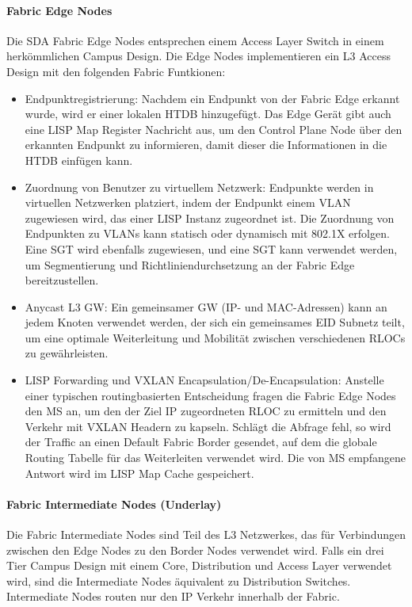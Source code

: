 \paragraph{Fabric Edge Nodes}
Die SDA Fabric Edge Nodes entsprechen einem Access Layer Switch in einem herkömmlichen Campus Design. Die Edge Nodes implementieren ein L3 Access Design mit den folgenden Fabric Funtkionen: \cite{sda-designguide}
\begin{itemize}	
	\item Endpunktregistrierung: Nachdem ein Endpunkt von der Fabric Edge erkannt wurde, wird er einer lokalen HTDB hinzugefügt. Das Edge Gerät gibt auch eine LISP Map Register Nachricht aus, um den Control Plane Node über den erkannten Endpunkt zu informieren, damit dieser die Informationen in die HTDB einfügen kann.
	\item Zuordnung von Benutzer zu virtuellem Netzwerk: Endpunkte werden in virtuellen Netzwerken platziert, indem der Endpunkt einem VLAN zugewiesen wird, das einer LISP Instanz zugeordnet ist. Die Zuordnung von Endpunkten zu VLANs kann statisch oder dynamisch mit 802.1X erfolgen. Eine SGT wird ebenfalls zugewiesen, und eine SGT kann verwendet werden, um Segmentierung und Richtliniendurchsetzung an der Fabric Edge bereitzustellen.
	\item Anycast L3 GW: Ein gemeinsamer GW (IP- und MAC-Adressen) kann an jedem Knoten verwendet werden, der sich ein gemeinsames EID Subnetz teilt, um eine optimale Weiterleitung und Mobilität zwischen verschiedenen RLOCs zu gewährleisten.
	\item LISP Forwarding und VXLAN Encapsulation/De-Encapsulation: Anstelle einer typischen routingbasierten Entscheidung fragen die Fabric Edge Nodes den MS an, um den der Ziel IP zugeordneten RLOC zu ermitteln und den Verkehr mit VXLAN Headern zu kapseln. Schlägt die Abfrage fehl, so wird der Traffic an einen Default Fabric Border gesendet, auf dem die globale Routing Tabelle für das Weiterleiten verwendet wird. Die von MS empfangene Antwort wird im LISP Map Cache gespeichert. 
\end{itemize} 

\paragraph{Fabric Intermediate Nodes (Underlay)}
Die Fabric Intermediate Nodes sind Teil des L3 Netzwerkes, das für Verbindungen zwischen den Edge Nodes zu den Border Nodes verwendet wird. Falls ein drei Tier Campus Design mit einem Core, Distribution und Access Layer verwendet wird, sind die Intermediate Nodes äquivalent zu Distribution Switches. Intermediate Nodes routen nur den IP Verkehr innerhalb der Fabric. \cite{sda-designguide}

